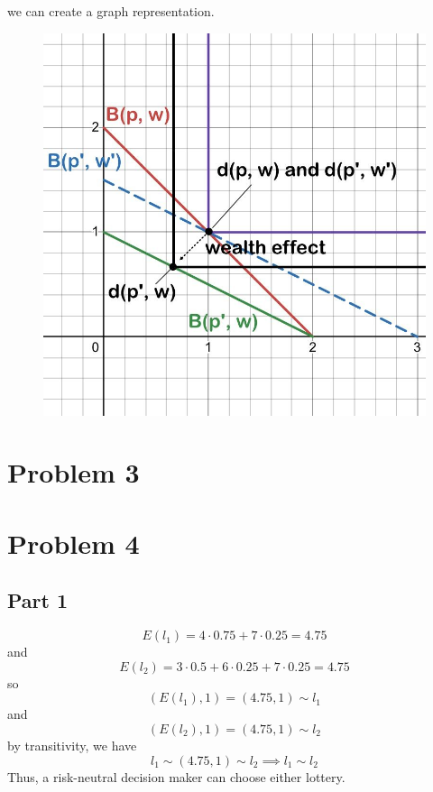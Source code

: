 \documentclass[12pt]{extarticle}
\numberwithin{table}{section}
\numberwithin{figure}{section}
\numberwithin{equation}{section}
\begin{document}
we can create a graph representation.
\begin{figure}[H]
    \centering
    \includegraphics[width=0.5\linewidth]{assets/decision-theory/ps2-ex2.jpg}
\end{figure}


\section*{Problem 3}

\section*{Problem 4}

\subsection*{Part 1}
\begin{equation}
    E(l_1) = 4 \cdot 0.75 + 7 \cdot 0.25 = 4.75
\end{equation}
and
\begin{equation}
    E(l_2) = 3 \cdot 0.5 + 6 \cdot 0.25 + 7 \cdot 0.25 = 4.75
\end{equation}
so
\begin{equation}
    (E(l_1), 1) = (4.75, 1) \sim l_1
\end{equation}
and
\begin{equation}
    (E(l_2), 1) = (4.75, 1) \sim l_2
\end{equation}
by transitivity, we have
\begin{equation}
    l_1 \sim (4.75, 1) \sim l_2 \implies l_1 \sim l_2
\end{equation}
Thus, a risk-neutral decision maker can choose either lottery.
\end{document}
